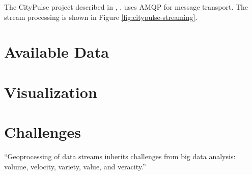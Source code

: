\documentclass[]{scrartcl}
\begin{document}
The CityPulse project described in \cite{Tsiatsis.2015}, \cite{Presser.2016}, \cite{Puiu.2016} \cite{Puiu.2016b} uses AMQP for message transport. The stream processing is shown in Figure \ref{fig:citypulse-streaming}.

\section{Available Data}

\section{Visualization}

\section{Challenges}
\enquote{Geoprocessing of data streams inherits challenges from big data analysis: volume, velocity, variety, value, and veracity.}~\cite[p.~1]{Morales.2015}

\printbibliography
\end{document}
